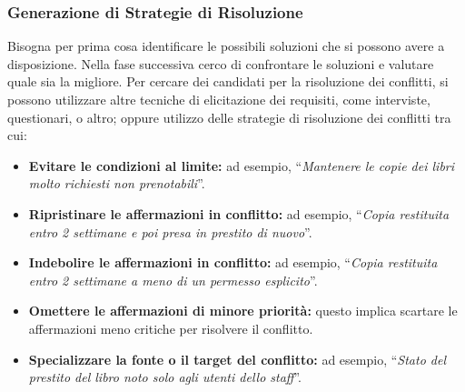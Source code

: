 \subsubsection{Generazione di Strategie di Risoluzione}
\begin{figure}[H]
    \centering
\end{figure}
Bisogna per prima cosa identificare le possibili soluzioni che si possono avere a 
disposizione. Nella fase successiva cerco di confrontare le soluzioni e valutare 
quale sia la migliore.
Per cercare dei candidati per la risoluzione dei conflitti, si possono utilizzare
altre tecniche di elicitazione dei requisiti, come interviste, questionari, o altro; 
oppure utilizzo delle strategie di risoluzione dei conflitti tra cui:

\begin{itemize}
  \item \textbf{Evitare le condizioni al limite:} ad esempio, ``\textit{Mantenere le copie
  dei libri molto richiesti non prenotabili}''.
  \item \textbf{Ripristinare le affermazioni in conflitto:} ad esempio, ``\textit{Copia restituita
  entro 2 settimane e poi presa in prestito di nuovo}''.
  \item \textbf{Indebolire le affermazioni in conflitto:} ad esempio, ``\textit{Copia restituita
  entro 2 settimane a meno di un permesso esplicito}''.
  \item \textbf{Omettere le affermazioni di minore priorità:} questo implica scartare le
  affermazioni meno critiche per risolvere il conflitto.
  \item \textbf{Specializzare la fonte o il target del conflitto:} ad esempio, ``\textit{Stato
  del prestito del libro noto solo agli utenti dello staff}''.
\end{itemize}


